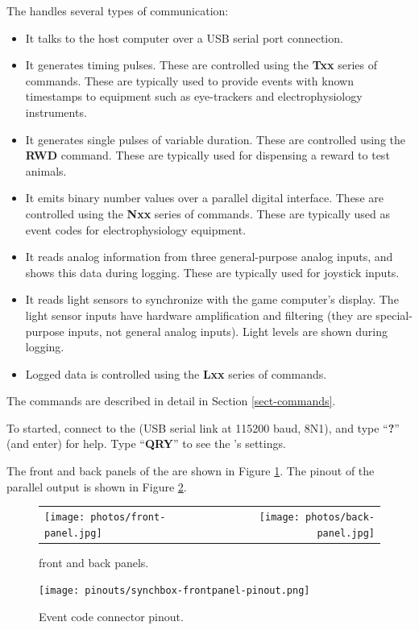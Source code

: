 \clearpage
The {\projectname} handles several types of communication:

\begin{itemize}

\item It talks to the host computer over a USB serial port connection.

\item It generates timing pulses. These are controlled using the 
\textbf{Txx} series of commands. These are typically used to provide
events with known timestamps to equipment such as eye-trackers and
electrophysiology instruments.

\item It generates single pulses of variable duration. These are controlled 
using the \textbf{RWD} command. These are typically used for dispensing
a reward to test animals.

\item It emits binary number values over a parallel digital interface. 
These are controlled using the \textbf{Nxx} series of commands. These are
typically used as event codes for electrophysiology equipment.

\item It reads analog information from three general-purpose analog inputs,
and shows this data during logging. These are typically used for joystick
inputs.

\item It reads light sensors to synchronize with the game computer's 
display.  The light sensor inputs have hardware amplification and filtering
(they are special-purpose inputs, not general analog inputs).
Light levels are shown during logging.

\item Logged data is controlled using the \textbf{Lxx} series of commands.

\end{itemize}

The commands are described in detail in Section \ref{sect-commands}.

To started, connect to the {\projectname} (USB serial link at 115200 baud,
8N1), and type ``\textbf{?}'' (and enter) for help. Type ``\textbf{QRY}''
to see the {\projectname}'s settings.

The front and back panels of the {\projectname} are shown in Figure
\ref{fig-panels}. The pinout of the parallel output is shown in Figure
\ref{fig-code-pinout}.

\begin{figure}[H]
\begin{center}
\begin{tabular}{lcr}
\texttt{[image: photos/front-panel.jpg]}
& ~~ &
\texttt{[image: photos/back-panel.jpg]} \\
\end{tabular}
\end{center}
\caption{{\projectname} front and back panels.}\label{fig-panels}
\end{figure}

\begin{figure}[H]
\begin{center}
\texttt{[image: pinouts/synchbox-frontpanel-pinout.png]}
\end{center}
\caption{Event code connector pinout.}\label{fig-code-pinout}
\end{figure}

%
